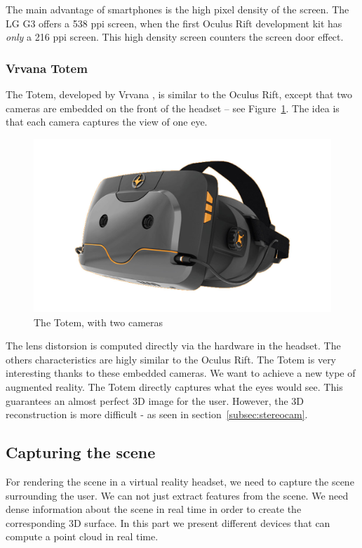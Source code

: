 \documentclass[12pt, twoside]{article}
\begin{document}
The main advantage of smartphones is the high pixel density of the screen. The LG G3 offers a 538 ppi screen, when the first Oculus Rift development kit has \textit{only} a 216 ppi screen. This high density screen counters the screen door effect.

\subsubsection{Vrvana Totem}
The Totem, developed by Vrvana \cite{Vrvana}, is similar to the Oculus Rift, except that two cameras are embedded on the front of the headset -- see Figure~\ref{fig:tpg}. The idea is that each camera captures the view of one eye.

\begin{figure}[h]
  \centering
  \includegraphics[scale=0.3]{TruePlayerGear.jpg}
  \caption{\label{fig:tpg} The Totem, with two cameras\protect\footnotemark}
\end{figure}

The lens distorsion is computed directly via the hardware in the headset. The others characteristics are higly similar to the Oculus Rift. The Totem is very interesting thanks to these embedded cameras. We want to achieve a new type of augmented reality. The Totem directly captures what the eyes would see. This guarantees an almost perfect 3D image for the user. However, the 3D reconstruction is more difficult - as seen in section~\ref{subsec:stereocam}.

\subsection{Capturing the scene}
For rendering the scene in a virtual reality headset, we need to capture the scene surrounding the user. We can not just extract features from the scene. We need dense information about the scene in real time in order to create the corresponding 3D surface. In this part we present different devices that can compute a point cloud in real time.
\end{document}
